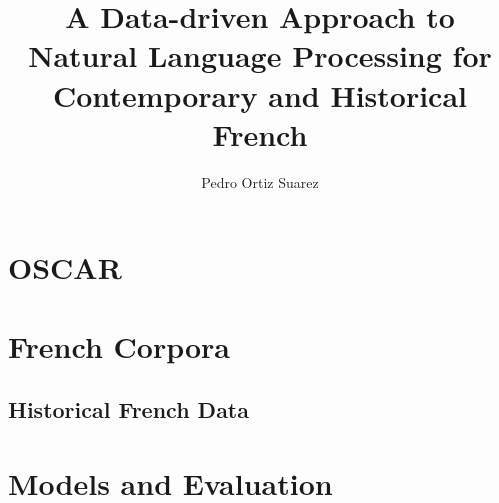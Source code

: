 \documentclass{mimosis}
\title{A Data-driven Approach to Natural Language Processing for Contemporary and Historical French}
\author{Pedro Ortiz Suarez}
\begin{document}
\frontmatter

% 

\tableofcontents

\mainmatter







\part{OSCAR}






\part{French Corpora}

\chapter{Historical French Data}


\part{Models and Evaluation}







\appendix









\backmatter

\begingroup
\let\clearpage\relax
\glsaddall
\printglossary[type=\acronymtype]
\newpage
\printglossary
\endgroup

\printindex





\end{document}
